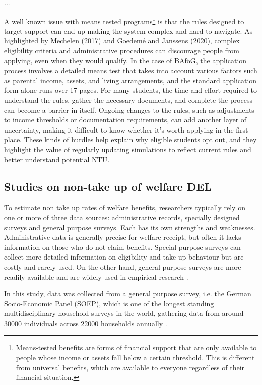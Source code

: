 ...

A well known issue with means tested programs\footnote{Means-tested benefits are forms of financial support that are only available to people whose income or assets fall below a certain threshold. This is different from universal benefits, which are available to everyone regardless of their financial situation.} is that the rules designed to target support can end up making the system complex and hard to navigate. As highlighted by Mechelen (2017) and Goedemé and Janssens (2020), complex eligibility criteria and administrative procedures can discourage people from applying, even when they would qualify. In the case of BAföG, the application process involves a detailed means test that takes into account various factors such as parental income, assets, and living arrangements, and the standard application form alone runs over 17 pages. For many students, the time and effort required to understand the rules, gather the necessary documents, and complete the process can become a barrier in itself. Ongoing changes to the rules, such as adjustments to income thresholds or documentation requirements, can add another layer of uncertainty, making it difficult to know whether it’s worth applying in the first place. These kinds of hurdles help explain why eligible students opt out, and they highlight the value of regularly updating simulations to reflect current rules and better understand potential NTU.

\subsection{Studies on non-take up of welfare DEL} \label{Studies-on-non-take-up-of-welfare} 

To estimate non take up rates of welfare benefits, researchers typically rely on one or more of three data sources: administrative records, specially designed surveys and general purpose surveys. Each has its own strengths and weaknesses. Administrative data is generally precise for welfare receipt, but often it lacks information on those who do not claim benefits. Special purpose surveys can collect more detailed information on eligibility and take up behaviour but are costly and rarely used. On the other hand, general purpose surveys are more readily available and are widely used in empirical research \citep{mechelen_who_2017}.

In this study, data was collected from a general purpose survey, i.e. the German Socio-Economic Panel (SOEP), which is one of the longest standing multidisciplinary household surveys in the world, gathering data from around 30000 individuals across 22000 households annually \citep{berlin_diw_nodate}.

